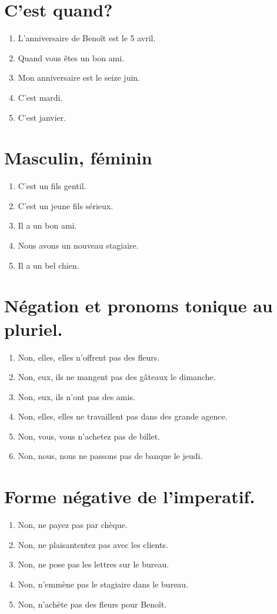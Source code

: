 \section{C'est quand?}

\begin{enumerate}
    \item L'anniversaire de Benoît est le 5 avril.
    \item Quand vous êtes un bon ami.
    \item Mon anniversaire est le seize juin.
    \item C'est mardi.
    \item C'est janvier.
\end{enumerate}

\section{Masculin, féminin}

\begin{enumerate}
    \item C'est un fils gentil.
    \item C'est un jeune fils sérieux.
    \item Il a un bon ami.
    \item Nous avons un nouveau stagiaire.
    \item Il a un bel chien.
\end{enumerate}

\section{Négation et pronoms tonique au pluriel.}

\begin{enumerate}
    \item Non, elles, elles n'offrent pas des fleurs.
    \item Non, eux, ils ne mangent pas des gâteaux le dimanche.
    \item Non, eux, ils n'ont pas des amis.
    \item Non, elles, elles ne travaillent pas dans des grande agence.
    \item Non, vous, vous n'achetez pas de billet.
    \item Non, nous, nous ne passons pas de banque le jeudi.
\end{enumerate}

\section{Forme négative de l'imperatif.}

\begin{enumerate}
    \item Non, ne payez pas par chèque.
    \item Non, ne plaisantentez pas avec les clients.
    \item Non, ne pose pas les lettres sur le bureau.
    \item Non, n'emmène pas le stagiaire dans le bureau.
    \item Non, n'achète pas des fleurs pour Benoît.
\end{enumerate}